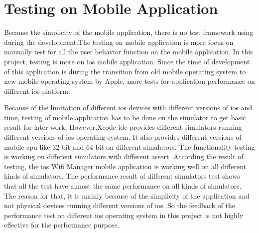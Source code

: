 \section{Testing on Mobile Application}
\par Because the simplicity of the mobile application, there is no test framework using during the development.The testing on mobile application is more focus on manually test for all the user behavior function on the mobile application. In this project, testing is more on \gls{ios} mobile application. Since the time of development of this application is during the transition from old mobile operating system to new mobile operating system by Apple, more tests for application performance on different \gls{ios} platform.
\par Because of the limitation of different \gls{ios} devices with different versions of \gls{ios} and time, testing of mobile application has to be done on the simulator to get basic result for later work. However,Xcode \gls{ide} provides different simulators running different versions of \gls{ios} operating system. It also provides different versions of mobile \gls{cpu} like 32-bit and 64-bit on different simulators. The functionality testing is working on different simulators with different assert. According the result of testing, the \gls{ios} Wifi Manager mobile application is working well on all different kinds of simulators. The performance result of different simulators test shows that all the test have almost the same performance on all kinds of simulators. The reason for that, it is mainly because of the simplicity of the application and not physical devices running different versions of \gls{ios}. So the feedback of the performance test on different \gls{ios} operating system  in this project is not highly effective for the performance purpose.